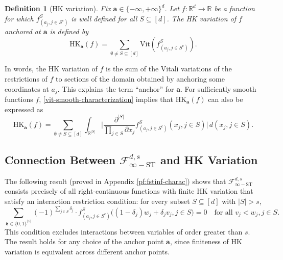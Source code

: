 \documentclass[10pt]{article}
\newtheorem{definition}{Definition}
\newcommand{\R}{{\mathbb R}}
\newcommand{\fstinf}{{\mathcal{F}^{d, s}_{\infty-\text{ST}}}}
\newcommand{\vit}{{\text{Vit}}}
\newcommand{\hk}{{\text{HK}}}
\newcommand{\abf}{{\mathbf{a}}}
\newcommand{\deltabf}{{\boldsymbol{\delta}}}
\begin{document}
\begin{definition}[HK variation]
Fix $\abf \in \{-\infty, +\infty\}^d$. Let $f: \R^d \to \R$ be a
function for which  
$f^S_{(a_j, j \in S^c)}$ is well defined for all $S \subseteq [d]$. 
The HK variation of $f$ anchored at $\abf$ is defined by
\begin{equation*}
    \hk_{\abf}(f) 
    = \sum_{\emptyset \neq S \subseteq [d]} 
    \vit(f^S_{(a_j, j \in S^c)}).
\end{equation*}  
\end{definition}
In words, the HK variation of $f$ is the sum of the Vitali 
variations of the restrictions of $f$ to sections of the domain 
obtained by anchoring some coordinates at $a_j$. This explains 
the term ``anchor'' for $\abf$. For sufficiently smooth functions 
$f$, \eqref{vit-smooth-characterization} implies that 
$\hk_{\abf}(f)$ can also be expressed as
\begin{equation}\label{eq:hk-smooth-characterization}
    \hk_{\abf}(f) = \sum_{\emptyset \neq S \subseteq [d]} 
    \int_{\R^{|S|}}
    \Big| \frac{\partial^{|S|}}{\prod_{j \in S} \partial x_j} 
    f^S_{(a_j, j \in S^c)}(x_j, j \in S) \Big| \, d(x_j, j \in S). 
\end{equation}


\subsection{Connection Between $\fstinf$ and HK Variation}
\label{sec:connection-fstinf-hk}
The following result (proved in Appendix \ref{pf:fstinf-charac}) 
shows that $\fstinf$ consists precisely of all right-continuous 
functions with finite HK variation that satisfy an interaction 
restriction condition: for every subset $S \subseteq [d]$ with 
$|S| > s$, 
\begin{equation}\label{eq:interaction-restriction-cond}
    \sum_{\deltabf \in \{0, 1\}^{|S|}} (-1)^{\sum_{j \in S} 
    \delta_j} \cdot f^S_{(a_j, j \in S^c)}\big((1 - \delta_j) 
    w_j + \delta_j v_j, j \in S\big) = 0
    \quad \text{for all } v_j < w_j, j \in S.
\end{equation}
This condition excludes interactions between variables of 
order greater than $s$. The result holds for any choice of 
the anchor point $\abf$, since finiteness of HK 
variation is equivalent across different anchor points.
\end{document}
